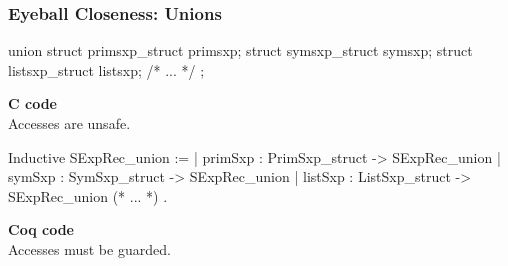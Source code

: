 \documentclass{beamer}
\begin{document}
\begin{frame}[fragile]
    \frametitle{Eyeball Closeness: Unions}

    \begin{changemargin}{-5mm}{-5mm}
\begin{minipage}{.8\textwidth}
\begin{ccode}
union {
    struct primsxp_struct primsxp;
    struct symsxp_struct symsxp;
    struct listsxp_struct listsxp;
    /* ... */
};
\end{ccode}
\end{minipage}
    \begin{minipage}{.18\textwidth}
    \textbf{C code}\\

    Accesses are unsafe.
    \end{minipage}

\begin{minipage}{.8\textwidth}
\begin{coqcode}
Inductive SExpRec_union :=
  | primSxp : PrimSxp_struct -> SExpRec_union
  | symSxp : SymSxp_struct -> SExpRec_union
  | listSxp : ListSxp_struct -> SExpRec_union
  (* ... *)
  .
\end{coqcode}
\end{minipage}
    \begin{minipage}{.18\textwidth}
    \textbf{Coq code}\\

    Accesses must be guarded.
    \end{minipage}
\end{changemargin}


\end{frame}
\end{document}
